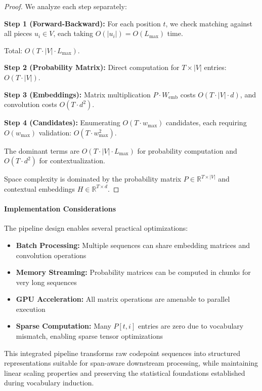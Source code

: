 \begin{proof}
	We analyze each step separately:
	
	\textbf{Step 1 (Forward-Backward):} For each position \(t\), we check matching against all pieces \(u_i \in V\), each taking \(O(|u_i|) = O(L_{\max})\) time. 
	
	Total: \(O(T \cdot |V| \cdot L_{\max})\).
	
	\textbf{Step 2 (Probability Matrix):} Direct computation for \(T \times |V|\) entries: \(O(T \cdot |V|)\).
	
	\textbf{Step 3 (Embeddings):} Matrix multiplication \(P \cdot W_{\mathrm{emb}}\) costs \(O(T \cdot |V| \cdot d)\), and convolution costs \(O(T \cdot d^2)\).
	
	\textbf{Step 4 (Candidates):} Enumerating \(O(T \cdot w_{\max})\) candidates, each requiring \(O(w_{\max})\) validation: \(O(T \cdot w_{\max}^2)\).
	
	The dominant terms are \(O(T \cdot |V| \cdot L_{\max})\) for probability computation and \(O(T \cdot d^2)\) for contextualization.
	
	Space complexity is dominated by the probability matrix \(P \in \mathbb{R}^{T \times |V|}\) and contextual embeddings \(H \in \mathbb{R}^{T \times d}\).
\end{proof}

\paragraph{Implementation Considerations}

The pipeline design enables several practical optimizations:

\begin{itemize}
	\item \textbf{Batch Processing:} Multiple sequences can share embedding matrices and convolution operations
	\item \textbf{Memory Streaming:} Probability matrices can be computed in chunks for very long sequences
	\item \textbf{GPU Acceleration:} All matrix operations are amenable to parallel execution
	\item \textbf{Sparse Computation:} Many \(P[t,i]\) entries are zero due to vocabulary mismatch, enabling sparse tensor optimizations
\end{itemize}

This integrated pipeline transforms raw codepoint sequences into structured representations suitable for span-aware downstream processing, while maintaining linear scaling properties and preserving the statistical foundations established during vocabulary induction.
